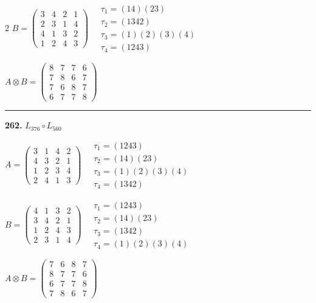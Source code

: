 \begin{multicols}{2}
$B = \begin{pmatrix} 3 & 4 & 2 & 1 \\ 2 & 3 & 1 & 4 \\ 4 & 1 & 3 & 2 \\ 1 & 2 & 4 & 3 \end{pmatrix} \quad \begin{matrix} \tau_{1}=(1 4)(2 3) \\ \tau_{2}=(1 3 4 2) \\ \tau_{3}=(1)(2)(3)(4) \\ \tau_{4}=(1 2 4 3) \end{matrix}$

$A \otimes B = \begin{pmatrix} 8 & 7 & 7 & 6 \\ 7 & 8 & 6 & 7 \\ 7 & 6 & 8 & 7 \\ 6 & 7 & 7 & 8 \end{pmatrix}$

\vspace{0.3em}
\hrule
\vspace{0.3em}

\noindent\textbf{262.} $L_{376} \circ L_{560}$

$A = \begin{pmatrix} 3 & 1 & 4 & 2 \\ 4 & 3 & 2 & 1 \\ 1 & 2 & 3 & 4 \\ 2 & 4 & 1 & 3 \end{pmatrix} \quad \begin{matrix} \tau_{1}=(1 2 4 3) \\ \tau_{2}=(1 4)(2 3) \\ \tau_{3}=(1)(2)(3)(4) \\ \tau_{4}=(1 3 4 2) \end{matrix}$

$B = \begin{pmatrix} 4 & 1 & 3 & 2 \\ 3 & 4 & 2 & 1 \\ 1 & 2 & 4 & 3 \\ 2 & 3 & 1 & 4 \end{pmatrix} \quad \begin{matrix} \tau_{1}=(1 2 4 3) \\ \tau_{2}=(1 4)(2 3) \\ \tau_{3}=(1 3 4 2) \\ \tau_{4}=(1)(2)(3)(4) \end{matrix}$

$A \otimes B = \begin{pmatrix} 7 & 6 & 8 & 7 \\ 8 & 7 & 7 & 6 \\ 6 & 7 & 7 & 8 \\ 7 & 8 & 6 & 7 \end{pmatrix}$


\end{multicols}
